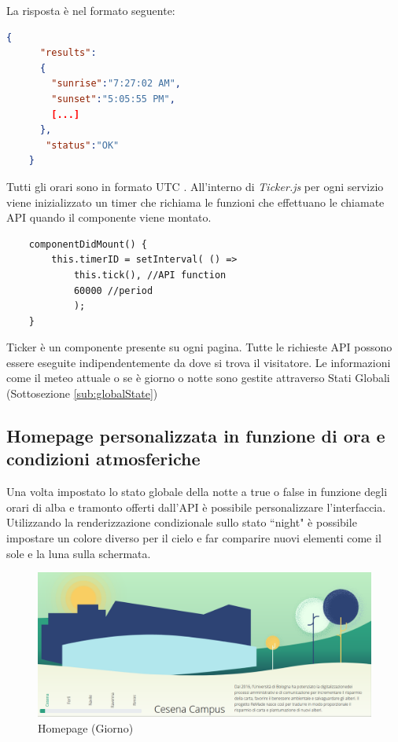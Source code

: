La risposta è nel formato seguente:
\begin{lstlisting}[language=json, numbers=none]
    {
      "results":
      {
        "sunrise":"7:27:02 AM",
        "sunset":"5:05:55 PM",
        [...]
      },
       "status":"OK"
    }
\end{lstlisting}
Tutti gli orari sono in formato UTC \cite{sunriseSunset}.\newline
All'interno di \textit{Ticker.js} per ogni servizio viene inizializzato un timer che richiama le funzioni che effettuano le chiamate API quando il componente viene montato.
\begin{lstlisting}
    componentDidMount() {
        this.timerID = setInterval( () => 
            this.tick(), //API function
            60000 //period
            );
    }
\end{lstlisting}
Ticker è un componente presente su ogni pagina. Tutte le richieste API possono essere eseguite indipendentemente da dove si trova il visitatore. Le informazioni come il meteo attuale o se è giorno o notte sono gestite attraverso Stati Globali (Sottosezione \ref{sub:globalState})
\subsection{Homepage personalizzata in funzione di ora e condizioni atmosferiche}
\label{sub:atm}
\noindent Una volta impostato lo stato globale della notte a true o false in funzione degli orari di alba e tramonto offerti dall'API è possibile personalizzare l'interfaccia.\newline
Utilizzando la renderizzazione condizionale sullo stato ``night" è possibile impostare un colore diverso per il cielo e far comparire nuovi elementi come il sole e la luna sulla schermata.
\begin{figure}[H]
    \centering
    \includegraphics[width=\linewidth]{img/day.png}
        \caption{Homepage (Giorno)}
    \label{fig:day}
\end{figure}

